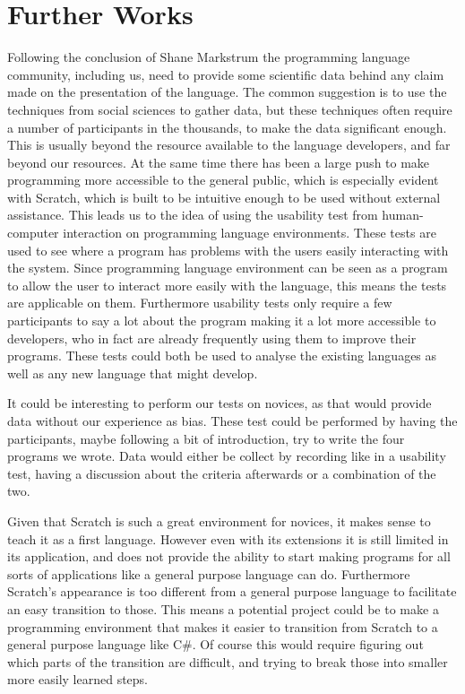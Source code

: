 \section{Further Works}
\label{sec:further_works}
Following the conclusion of Shane Markstrum\cite{ShaneMarkstrum10} the programming language community, including us, need to provide some scientific data behind any claim made on the presentation of the language.
The common suggestion is to use the techniques from social sciences to gather data\cite{Socio-plt}, but these techniques often require a number of participants in the thousands, to make the data significant enough.
This is usually beyond the resource available to the language developers, and far beyond our resources.
At the same time there has been a large push to make programming more accessible to the general public, which is especially evident with Scratch, which is built to be intuitive enough to be used without external assistance.
This leads us to the idea of using the usability test from human-computer interaction on programming language environments.
These tests are used to see where a program has problems with the users easily interacting with the system.
Since programming language environment can be seen as a program to allow the user to interact more easily with the language, this means the tests are applicable on them.
Furthermore usability tests only require a few participants to say a lot about the program making it a lot more accessible to developers, who in fact are already frequently using them to improve their programs.
These tests could both be used to analyse the existing languages as well as any new language that might develop.

It could be interesting to perform our tests on novices, as that would provide data without our experience as bias.
These test could be performed by having the participants, maybe following a bit of introduction, try to write the four programs we wrote.
Data would either be collect by recording like in a usability test, having a discussion about the criteria afterwards or a combination of the two.

Given that Scratch is such a great environment for novices, it makes sense to teach it as a first language.
However even with its extensions it is still limited in its application, and does not provide the ability to start making programs for all sorts of applications like a general purpose language can do.
Furthermore Scratch's appearance is too different from a general purpose language to facilitate an easy transition to those.
This means a potential project could be to make a programming environment that makes it easier to transition from Scratch to a general purpose language like C\#.
Of course this would require figuring out which parts of the transition are difficult, and trying to break those into smaller more easily learned steps.

